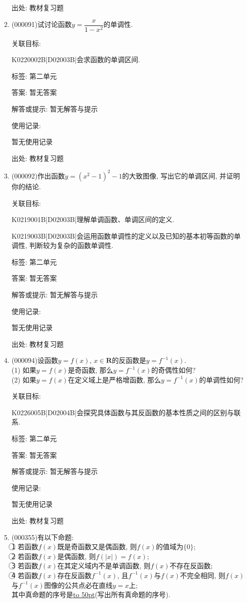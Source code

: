 \documentclass[10pt,a4paper]{article}
\newcommand{\blank}[1]{\underline{\hbox to #1pt{}}}
\begin{document}
\begin{enumerate}[1.]
出处: 教材复习题
\item { (000091)}试讨论函数$y=\dfrac{x}{1-x^2}$的单调性.


关联目标:

K0220002B|D02003B|会求函数的单调区间.



标签: 第二单元

答案: 暂无答案

解答或提示: 暂无解答与提示

使用记录:

暂无使用记录


出处: 教材复习题
\item { (000092)}作出函数$y=(x^2-1)^2-1$的大致图像, 写出它的单调区间, 并证明你的结论.


关联目标:

K0219001B|D02003B|理解单调函数、单调区间的定义.

K0219003B|D02003B|会运用函数单调性的定义以及已知的基本初等函数的单调性, 判断较为复杂的函数单调性.



标签: 第二单元

答案: 暂无答案

解答或提示: 暂无解答与提示

使用记录:

暂无使用记录


出处: 教材复习题
\item { (000094)}设函数$y=f(x)$, $x\in \mathbf{R}$的反函数是$y=f^{-1}(x)$.\\
(1) 如果$y=f(x)$是奇函数, 那么$y=f^{-1}(x)$的奇偶性如何?\\
(2) 如果$y=f(x)$在定义域上是严格增函数, 那么$y=f^{-1}(x)$的单调性如何?


关联目标:

K0226005B|D02004B|会探究具体函数与其反函数的基本性质之间的区别与联系.



标签: 第二单元

答案: 暂无答案

解答或提示: 暂无解答与提示

使用记录:

暂无使用记录


出处: 教材复习题
\item { (000355)}有以下命题:\\
\textcircled{1} 若函数$f(x)$既是奇函数又是偶函数, 则$f(x)$的值域为$\{0\}$; \\
\textcircled{2} 若函数$f(x)$是偶函数, 则$f(|x|)=f(x)$;\\
\textcircled{3} 若函数$f(x)$在其定义域内不是单调函数, 则$f(x)$不存在反函数;\\
\textcircled{4} 若函数$f(x)$存在反函数${{f}^{-1}}(x)$, 且${{f}^{-1}}(x)$与$f(x)$不完全相同, 则$f(x)$与${{f}^{-1}}(x)$图像的公共点必在直线$y=x$上; \\
其中真命题的序号是\blank{50}(写出所有真命题的序号).



\end{enumerate}
\end{document}
